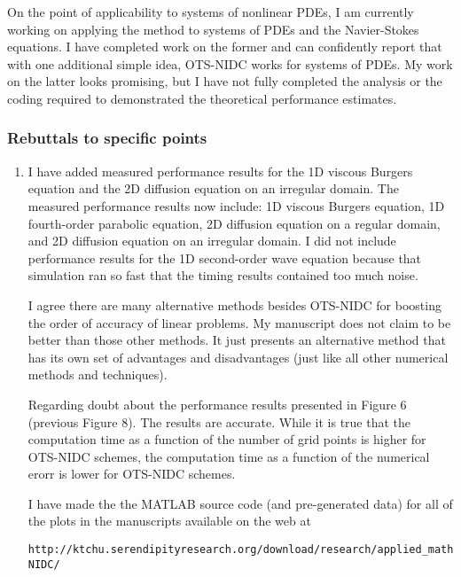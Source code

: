 \documentclass[12pt]{article}
\begin{document}
On the point of applicability to systems of nonlinear PDEs, I am currently 
working on applying the method to systems of PDEs and the Navier-Stokes
equations.  I have completed work on the former and can confidently report that
with one additional simple idea, OTS-NIDC works for systems of PDEs.  My work
on the latter looks promising, but I have not fully completed the analysis or
the coding required to demonstrated the theoretical performance estimates.

\subsubsection*{Rebuttals to specific points}

\begin{enumerate}

\item I have added measured performance results for the 1D viscous Burgers
      equation and the 2D diffusion equation on an irregular domain.  The 
      measured performance results now include: 1D viscous Burgers equation,
      1D fourth-order parabolic equation, 2D diffusion equation on a regular 
      domain, and 2D diffusion equation on an irregular domain.  I did not 
      include performance results for the 1D second-order wave equation because
      that simulation ran so fast that the timing results contained too much 
      noise.

      I agree there are many alternative methods besides OTS-NIDC for boosting
      the order of accuracy of linear problems.  My manuscript does not claim
      to be better than those other methods.  It just presents an alternative
      method that has its own set of advantages and disadvantages (just like
      all other numerical methods and techniques).

      Regarding doubt about the performance results presented in Figure 6 
      (previous Figure 8).  The results are accurate.  While it is true that
      the computation time as a function of the number of grid points is 
      higher for OTS-NIDC schemes, the computation time as a function of the
      numerical erorr is lower for OTS-NIDC schemes.
    
      I have made the the MATLAB source code (and pre-generated data) for all of
      the plots in the manuscripts available on the web at

\begin{verbatim}
http://ktchu.serendipityresearch.org/download/research/applied_math/OTS-NIDC/
\end{verbatim}


\end{enumerate}
\end{document}
